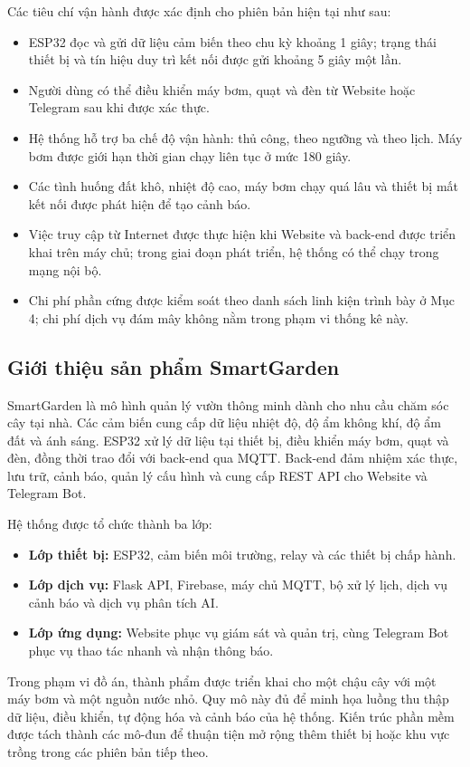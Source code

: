 Các tiêu chí vận hành được xác định cho phiên bản hiện tại như sau:

\begin{itemize}
    \item ESP32 đọc và gửi dữ liệu cảm biến theo chu kỳ khoảng 1 giây; trạng thái
    thiết bị và tín hiệu duy trì kết nối được gửi khoảng 5 giây một lần.
    \item Người dùng có thể điều khiển máy bơm, quạt và đèn từ Website hoặc
    Telegram sau khi được xác thực.
    \item Hệ thống hỗ trợ ba chế độ vận hành: thủ công, theo ngưỡng và theo lịch.
    Máy bơm được giới hạn thời gian chạy liên tục ở mức 180 giây.
    \item Các tình huống đất khô, nhiệt độ cao, máy bơm chạy quá lâu và thiết bị
    mất kết nối được phát hiện để tạo cảnh báo.
    \item Việc truy cập từ Internet được thực hiện khi Website và back-end được
    triển khai trên máy chủ; trong giai đoạn phát triển, hệ thống có thể chạy
    trong mạng nội bộ.
    \item Chi phí phần cứng được kiểm soát theo danh sách linh kiện trình bày ở
    Mục 4; chi phí dịch vụ đám mây không nằm trong phạm vi thống kê này.
\end{itemize}

\subsection{Giới thiệu sản phẩm SmartGarden}

SmartGarden là mô hình quản lý vườn thông minh dành cho nhu cầu chăm sóc cây tại
nhà. Các cảm biến cung cấp dữ liệu nhiệt độ, độ ẩm không khí, độ ẩm đất và ánh
sáng. ESP32 xử lý dữ liệu tại thiết bị, điều khiển máy bơm, quạt và đèn, đồng
thời trao đổi với back-end qua MQTT. Back-end đảm nhiệm xác thực, lưu trữ, cảnh
báo, quản lý cấu hình và cung cấp REST API cho Website và Telegram Bot.

Hệ thống được tổ chức thành ba lớp:

\begin{itemize}
    \item \textbf{Lớp thiết bị:} ESP32, cảm biến môi trường, relay và các thiết
    bị chấp hành.
    \item \textbf{Lớp dịch vụ:} Flask API, Firebase, máy chủ MQTT, bộ xử lý lịch,
    dịch vụ cảnh báo và dịch vụ phân tích AI.
    \item \textbf{Lớp ứng dụng:} Website phục vụ giám sát và quản trị, cùng
    Telegram Bot phục vụ thao tác nhanh và nhận thông báo.
\end{itemize}

Trong phạm vi đồ án, thành phẩm được triển khai cho một chậu cây với một máy bơm
và một nguồn nước nhỏ. Quy mô này đủ để minh họa luồng thu thập dữ liệu, điều
khiển, tự động hóa và cảnh báo của hệ thống. Kiến trúc phần mềm được tách thành
các mô-đun để thuận tiện mở rộng thêm thiết bị hoặc khu vực trồng trong các phiên
bản tiếp theo.
